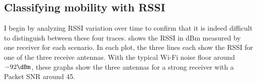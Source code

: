 \subsection{Classifying mobility with RSSI}
I begin by analyzing RSSI variation over time to confirm that it is indeed difficult to distinguish between these four traces.  shows the RSSI in dBm measured by one receiver for each scenario. In each plot, the three lines each show the RSSI for one of the three receive antennas. With the typical Wi-Fi noise floor around $-92\dBm$, these graphs show the three antennas for a strong receiver with a Packet SNR around 45\dB.

\begin{figure}[htb]
	\centering
	\hspace{0.06\textwidth}%
	

\end{figure}
